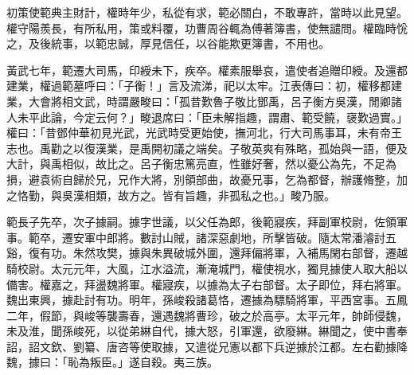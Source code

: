 \begin{pinyinscope}
初策使範典主財計，權時年少，私從有求，範必關白，不敢專許，當時以此見望。權守陽羨長，有所私用，策或料覆，功曹周谷輒為傅著簿書，使無譴問。權臨時恱之，及後統事，以範忠誠，厚見信任，以谷能欺更簿書，不用也。

黃武七年，範遷大司馬，印綬未下，疾卒。權素服舉哀，遣使者追贈印綬。及還都建業，權過範墓呼曰：「子衡！」言及流涕，祀以太牢。江表傳曰：初，權移都建業，大會將相文武，時謂嚴畯曰：「孤昔歎魯子敬比鄧禹，呂子衡方吳漢，閒卿諸人未平此論，今定云何？」畯退席曰：「臣未解指趣，謂肅、範受饒，襃歎過實。」權曰：「昔鄧仲華初見光武，光武時受更始使，撫河北，行大司馬事耳，未有帝王志也。禹勸之以復漢業，是禹開初議之端矣。子敬英爽有殊略，孤始與一語，便及大計，與禹相似，故比之。呂子衡忠篤亮直，性雖好奢，然以憂公為先，不足為損，避袁術自歸於兄，兄作大將，別領部曲，故憂兄事，乞為都督，辦護脩整，加之恪勤，與吳漢相類，故方之。皆有旨趣，非孤私之也。」畯乃服。

範長子先卒，次子據嗣。據字世議，以父任為郎，後範寢疾，拜副軍校尉，佐領軍事。範卒，遷安軍中郎將。數討山賊，諸深惡劇地，所擊皆破。隨太常潘濬討五谿，復有功。朱然攻樊，據與朱異破城外圍，還拜偏將軍，入補馬閑右部督，遷越騎校尉。太元元年，大風，江水溢流，漸淹城門，權使視水，獨見據使人取大船以備害。權嘉之，拜盪魏將軍。權寢疾，以據為太子右部督。太子即位，拜右將軍。魏出東興，據赴討有功。明年，孫峻殺諸葛恪，遷據為驃騎將軍，平西宮事。五鳳二年，假節，與峻等襲壽春，還遇魏將曹珍，破之於高亭。太平元年，帥師侵魏，未及淮，聞孫峻死，以從弟綝自代，據大怒，引軍還，欲廢綝。綝聞之，使中書奉詔，詔文欽、劉纂、唐咨等使取據，又遣從兄憲以都下兵逆據於江都。左右勸據降魏，據曰：「恥為叛臣。」遂自殺。夷三族。


\end{pinyinscope}
